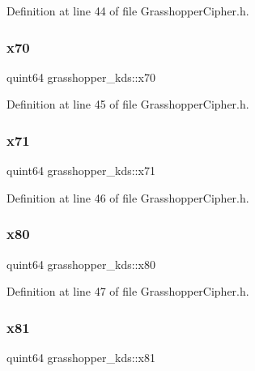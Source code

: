 Definition at line 44 of file Grasshopper\+Cipher.\+h.

\mbox{\label{structgrasshopper__kds_af99523e7d24d327ae111a6874bd5f071}} 
\subsubsection{\texorpdfstring{x70}{x70}}
{\footnotesize\ttfamily quint64 grasshopper\+\_\+kds\+::x70}



Definition at line 45 of file Grasshopper\+Cipher.\+h.

\mbox{\label{structgrasshopper__kds_a78cd3b18320cdfe5c08c2dc38d59f2bd}} 
\subsubsection{\texorpdfstring{x71}{x71}}
{\footnotesize\ttfamily quint64 grasshopper\+\_\+kds\+::x71}



Definition at line 46 of file Grasshopper\+Cipher.\+h.

\mbox{\label{structgrasshopper__kds_a85e2b6a55ddcde2fbeec73c890d1499b}} 
\subsubsection{\texorpdfstring{x80}{x80}}
{\footnotesize\ttfamily quint64 grasshopper\+\_\+kds\+::x80}



Definition at line 47 of file Grasshopper\+Cipher.\+h.

\mbox{\label{structgrasshopper__kds_a1aad104bd24ba823f09d22f7ea7a0bcb}} 
\subsubsection{\texorpdfstring{x81}{x81}}
{\footnotesize\ttfamily quint64 grasshopper\+\_\+kds\+::x81}



